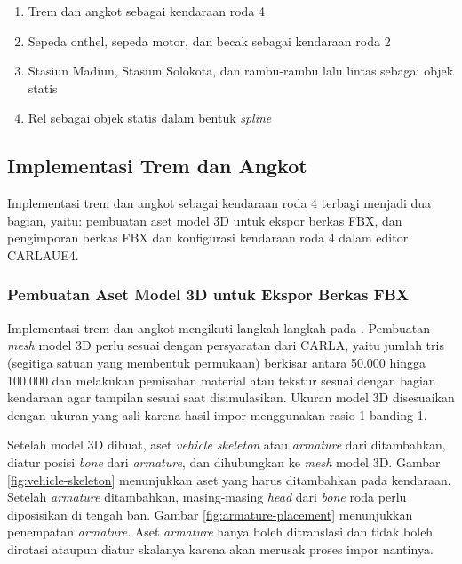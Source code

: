 \begin{enumerate}
    \item Trem dan angkot sebagai kendaraan roda 4
    \item Sepeda onthel, sepeda motor, dan becak sebagai kendaraan roda 2
    \item Stasiun Madiun, Stasiun Solokota, dan rambu-rambu lalu lintas sebagai
    objek statis
    \item Rel sebagai objek statis dalam bentuk \textit{spline}
\end{enumerate}


\subsection{Implementasi Trem dan Angkot}

Implementasi trem dan angkot sebagai kendaraan roda 4 terbagi menjadi dua
bagian, yaitu: pembuatan aset model 3D untuk ekspor berkas FBX, dan
pengimporan berkas FBX dan konfigurasi kendaraan roda 4 dalam editor CARLAUE4.

\subsubsection{Pembuatan Aset Model 3D untuk Ekspor Berkas FBX}

Implementasi trem dan angkot mengikuti langkah-langkah pada
\textcite{carla-documentation}. Pembuatan \textit{mesh} model 3D perlu sesuai
dengan persyaratan dari CARLA, yaitu jumlah tris (segitiga satuan yang membentuk
permukaan) berkisar antara 50.000 hingga 100.000 dan melakukan pemisahan
material atau tekstur sesuai dengan bagian kendaraan agar tampilan sesuai saat
disimulasikan. Ukuran model 3D disesuaikan dengan ukuran yang asli karena hasil
impor menggunakan rasio 1 banding 1.

Setelah model 3D dibuat, aset \textit{vehicle skeleton} atau \textit{armature}
dari \textcite{carla-documentation} ditambahkan, diatur posisi \textit{bone}
dari \textit{armature}, dan dihubungkan ke \textit{mesh} model 3D. Gambar
\ref{fig:vehicle-skeleton} menunjukkan aset yang harus ditambahkan pada
kendaraan. Setelah \textit{armature} ditambahkan, masing-masing \textit{head}
dari \textit{bone} roda perlu diposisikan di tengah ban. Gambar
\ref{fig:armature-placement} menunjukkan penempatan \textit{armature}. Aset
\textit{armature} hanya boleh ditranslasi dan tidak boleh dirotasi ataupun
diatur skalanya karena akan merusak proses impor nantinya.

